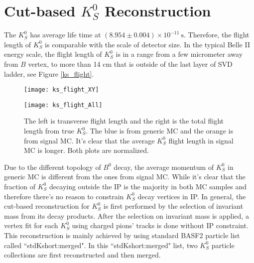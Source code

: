  \section{Cut-based $K_S^0$ Reconstruction}
 
 The $K_S^0$ has average life time at $(8.954 \pm 0.004) \times 10 ^{-11} \:\text{s}$. Therefore, the flight length of $K_S^0$ is comparable with the scale of detector size. In the typical Belle II energy scale, the flight length of $K_S^0$ is in a range from a few micrometer away from $B$ vertex, to more than 14 cm that is outside of the last layer of SVD ladder, see Figure \ref{ks_flight}.

 \begin{figure}[htpb]
 	\centering 
 	\begin{minipage}[t]{0.45\linewidth}
 	\texttt{[image: ks\_flight\_XY]}
 	\end{minipage}
	\begin{minipage}[t]{0.45\linewidth}
		\texttt{[image: ks\_flight\_All]}
	\end{minipage}
 	\caption{The left is transverse flight length and the right is the total flight length from true $K_S^0$.  The blue is from generic MC and  the orange is from signal MC. It's clear that the average $K_S^0$ flight length in signal MC is longer. Both plots are normalized.}
 	\label{fig:ks_flight}
 \end{figure}
 
 Due to the different topology of $B^0$ decay, the average momentum of $K_S^0$ in generic MC is different from the ones from signal MC. While it's clear that the fraction of $K_S^0$ decaying outside the IP is the majority in both MC samples and therefore there's no reason to constrain $K_S^0$ decay vertices in IP. In general, the cut-based reconstruction for $K_S^0$ is first performed by the selection of invariant mass from its decay products. After the selection on invariant mass is applied, a vertex fit for each $K_S^0$ using charged pions' tracks is done without IP constraint. This reconstruction is mainly achieved by using standard BASF2 particle list called ``stdKshort:merged". In this ``stdKshort:merged" list, two $K_S^0$ particle collections are first reconstructed and then merged.
  

